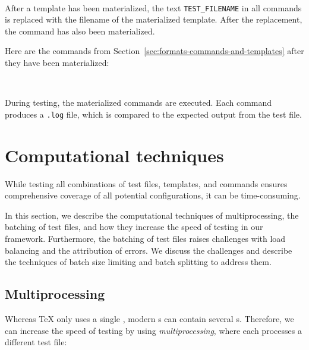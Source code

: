 \documentclass[final]{ltugboat}
\begin{document}
\medskip
\noindent
{} \\[0.4em]

\medskip
\exampleSeparator

\medskip
\noindent
{}

\medskip

After a template has been materialized, the text \texttt{TEST\_FILENAME} in all commands is replaced with the filename of the materialized template. After the replacement, the command has also been materialized.

Here are the commands  from Section~\ref{sec:formats-commands-and-templates} after they have been materialized:

\smallskip
\noindent
{} \\[0.8em]

\smallskip

\noindent
During testing, the materialized commands are executed. Each command produces a \texttt{.log} file, which is compared to the expected output from the test file.

\section{Computational techniques}
\label{sec:computational-techniques}

While testing all combinations of test files, templates, and commands ensures comprehensive coverage of all potential configurations, it can be time-consuming.

In this section, we describe the computational techniques of multiprocessing, the batching of test files, and how they increase the speed of testing in our framework.
Furthermore, the batching of test files raises challenges with load balancing and the attribution of errors. We discuss the challenges and describe the techniques of batch size limiting and batch splitting to address them.

\subsection{Multiprocessing}
\label{sec:multiprocessing}
Whereas \TeX{} only uses a single , modern s can contain several s. Therefore, we can increase the speed of testing by using \emph{multiprocessing}, where each  processes a different test file:
\end{document}
